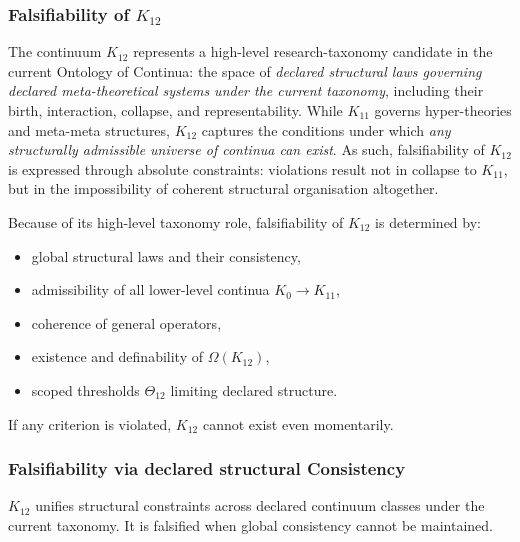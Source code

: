 
\subsubsection{Falsifiability of $K_{12}$}
\label{sec:falsifiability-k12}

The continuum $K_{12}$ represents a high-level research-taxonomy candidate in the
current Ontology of Continua: the space of \emph{declared structural
laws governing declared meta-theoretical systems under the current taxonomy}, including their
birth, interaction, collapse, and representability. While $K_{11}$
governs hyper-theories and meta-meta structures, $K_{12}$ captures the
conditions under which \emph{any structurally admissible universe of
continua can exist}. As such, falsifiability of $K_{12}$ is expressed
through absolute constraints: violations result not in collapse to
$K_{11}$, but in the impossibility of coherent structural organisation
altogether.

Because of its high-level taxonomy role, falsifiability of $K_{12}$ is determined
by:

\begin{itemize}
    \item global structural laws and their consistency,
    \item admissibility of all lower-level continua $K_0 \to K_{11}$,
    \item coherence of general operators,
    \item existence and definability of $\Omega(K_{12})$,
    \item scoped thresholds $\Theta_{12}$ limiting declared structure.
\end{itemize}

If any criterion is violated, $K_{12}$ cannot exist even momentarily.



\subsubsection{Falsifiability via declared structural Consistency}

$K_{12}$ unifies structural constraints across declared continuum classes under the current taxonomy.
It is falsified when global consistency cannot be maintained.


